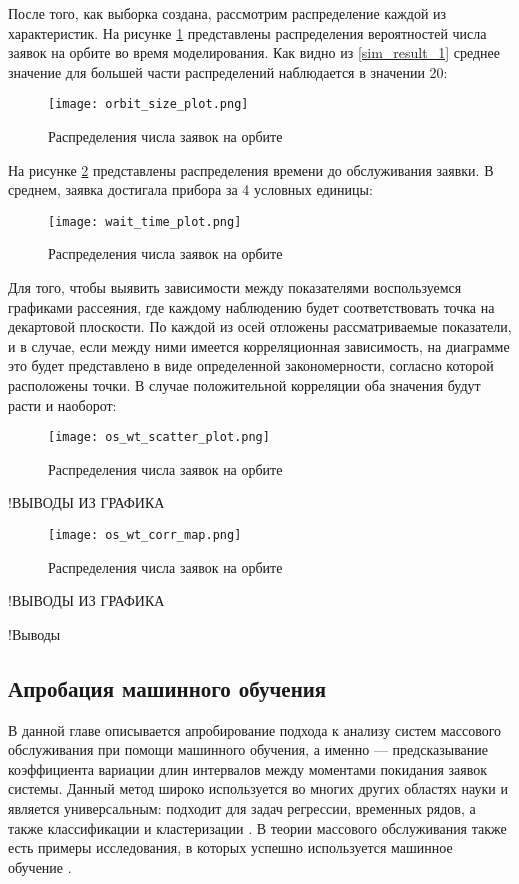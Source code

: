 После того, как выборка создана, рассмотрим распределение каждой из характеристик. На рисунке \ref{orbit_size_plot} представлены распределения вероятностей числа заявок на орбите во время моделирования. Как видно из \ref{sim_result_1} среднее значение для большей части распределений наблюдается в значении 20:

\begin{figure}[H]
	\centering
	\texttt{[image: orbit\_size\_plot.png]}
	\caption{Распределения числа заявок на орбите} 
	\label{orbit_size_plot}
\end{figure}

На рисунке \ref{wait_time_plot} представлены распределения времени до обслуживания заявки. В среднем, заявка достигала прибора за 4 условных единицы:

\begin{figure}[H]
	\centering
	\texttt{[image: wait\_time\_plot.png]}
	\caption{Распределения числа заявок на орбите} 
	\label{wait_time_plot}
\end{figure}

Для того, чтобы выявить зависимости между показателями воспользуемся графиками рассеяния, где каждому наблюдению будет соответствовать точка на декартовой плоскости. По каждой из осей отложены рассматриваемые показатели, и в случае, если между ними имеется корреляционная зависимость, на диаграмме это будет представлено в виде определенной закономерности, согласно которой расположены точки. В случае положительной корреляции оба значения будут расти и наоборот:
\begin{figure}[H]
	\centering
	\texttt{[image: os\_wt\_scatter\_plot.png]}
	\caption{Распределения числа заявок на орбите} 
	\label{os_wt_scatter_plot}
\end{figure}

!ВЫВОДЫ ИЗ ГРАФИКА

\begin{figure}[H]
	\centering
	\texttt{[image: os\_wt\_corr\_map.png]}
	\caption{Распределения числа заявок на орбите} 
	\label{os_wt_corr_map}
\end{figure}

!ВЫВОДЫ ИЗ ГРАФИКА

!Выводы

\subsection{Апробация машинного обучения}
В данной главе описывается апробирование подхода к анализу систем массового обслуживания при помощи машинного обучения, а именно --- предсказывание коэффициента вариации длин интервалов между моментами покидания заявок системы. Данный метод широко используется во многих других областях науки и является универсальным: подходит для задач регрессии, временных рядов, а также классификации и кластеризации \cite{libbrecht2015machine,shinde2018review,soofi2017classification}. В теории массового обслуживания также есть примеры исследования, в которых успешно используется машинное обучение \cite{ojeda2021learning,xue2016scheduling,balla2018reliability}.


